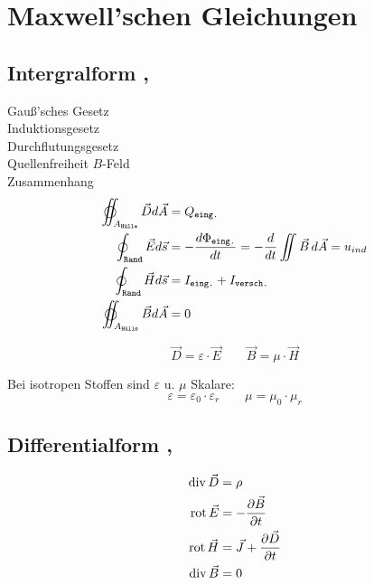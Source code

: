 \section{Maxwell’schen Gleichungen}

\subsection{Intergralform , }
Gauß'sches Gesetz\\
Induktionsgesetz\\
Durchflutungsgesetz\\
Quellenfreiheit $B$-Feld\\
Zusammenhang
\begin{align*}
    \varoiint_{A_\texttt{Hülle}} \vec{D} d \vec{A} & = Q_\texttt{eing.}                                                                      \\
    \oint_\texttt{Rand} \vec{E} d \vec{s}          & = -\dfrac{d\Phi_\texttt{eing.}}{dt} = -\frac{d}{dt} \iint \vec{B} \, d\vec{A} = u_{ind} \\
    \oint_\texttt{Rand} \vec{H} d \vec{s}          & = I_\texttt{eing.} + I_\texttt{versch.}                                                 \\
    \varoiint_{A_\texttt{Hülle}} \vec{B} d \vec{A} & = 0
\end{align*}

\[
    \vec{D} = \varepsilon \cdot \vec{E} \qquad
    \vec{B} = \mu \cdot \vec{H}
\]

Bei isotropen Stoffen sind $\varepsilon$ u. $\mu$ Skalare:
\[
    \varepsilon = \varepsilon_0 \cdot \varepsilon_r \qquad \mu = \mu_0 \cdot \mu_r
\]

\subsection{Differentialform , }
\begin{align*}
    \operatorname{div} \vec{D}             & = \rho                                           \\
    \operatorname{rot} \vec{E} & = -\dfrac{\partial \vec{B}}{\partial t}          \\
    \operatorname{rot} \vec{H} & = \vec{J} + \dfrac{\partial \vec{D}}{\partial t} \\
    \operatorname{div} \vec{B}             & = 0
\end{align*}

